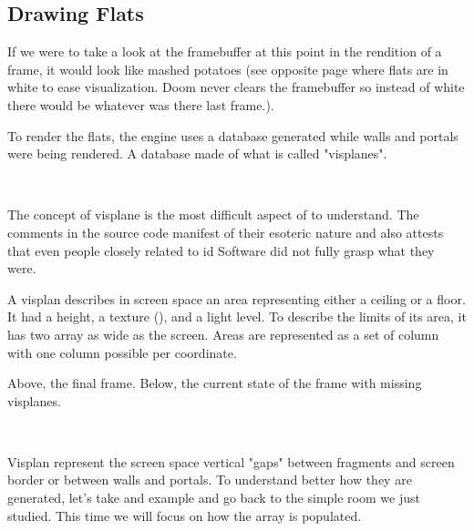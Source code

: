\subsection{Drawing Flats}
 If we were to take a look at the framebuffer at this point in the rendition of a frame, it would look like mashed potatoes (see opposite page where flats are in white to ease visualization. Doom never clears the framebuffer so instead of white there would be whatever was there last frame.).\\
\par
To render the flats, the engine uses a database generated while walls and portals were being rendered. A database made of what is called "visplanes".\\
\par
{}\\
\par
The concept of visplane is the most difficult aspect of \doom to understand. The comments in the source code manifest of their esoteric nature and also attests that even people closely related to id Software did not fully grasp what they were.\\
\par
A visplan describes in screen space an area representing either a ceiling or a floor. It had a height, a texture (), and a light level. To describe the limits of its area, it has two array as wide as the screen. Areas are represented as a set of column with one column possible per  coordinate.
\par


 \label{mashed_potatoes1.png}

Above, the final frame. Below, the current state of the frame with missing visplanes.

\vspace{2mm}


\\
\par
Visplan represent the screen space vertical "gaps" between fragments and screen border or between walls and portals. To understand better how they are generated, let's take and example and go back to the simple room we just studied. This time we will focus on how the  array is populated.\\
\par

